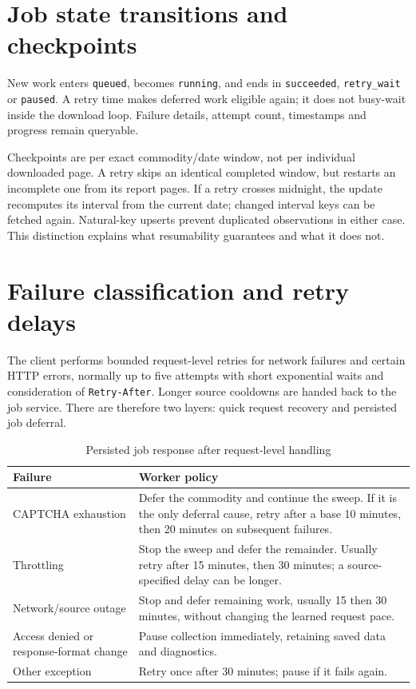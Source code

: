 \documentclass[12pt,a4paper,oneside]{report}
\numberwithin{equation}{chapter}
\numberwithin{figure}{chapter}
\numberwithin{table}{chapter}
\theoremstyle{definition}
\begin{document}
\section{Job state transitions and checkpoints}
New work enters \texttt{queued}, becomes \texttt{running}, and ends in \texttt{succeeded}, \texttt{retry\_wait} or \texttt{paused}. A retry time makes deferred work eligible again; it does not busy-wait inside the download loop. Failure details, attempt count, timestamps and progress remain queryable.

Checkpoints are per exact commodity/date window, not per individual downloaded page. A retry skips an identical completed window, but restarts an incomplete one from its report pages. If a retry crosses midnight, the update recomputes its interval from the current date; changed interval keys can be fetched again. Natural-key upserts prevent duplicated observations in either case. This distinction explains what resumability guarantees and what it does not.

\section{Failure classification and retry delays}
The client performs bounded request-level retries for network failures and certain HTTP errors, normally up to five attempts with short exponential waits and consideration of \texttt{Retry-After}. Longer source cooldowns are handed back to the job service. There are therefore two layers: quick request recovery and persisted job deferral.

\begin{table}[H]
\centering
\caption{Persisted job response after request-level handling}
\label{tab:retry}
\small
\begin{tabular}{@{}p{}p{}@{}}
\toprule
Failure & Worker policy \\
\midrule
CAPTCHA exhaustion & Defer the commodity and continue the sweep. If it is the only deferral cause, retry after a base 10 minutes, then 20 minutes on subsequent failures. \\
Throttling & Stop the sweep and defer the remainder. Usually retry after 15 minutes, then 30 minutes; a source-specified delay can be longer. \\
Network/source outage & Stop and defer remaining work, usually 15 then 30 minutes, without changing the learned request pace. \\
Access denied or response-format change & Pause collection immediately, retaining saved data and diagnostics. \\
Other exception & Retry once after 30 minutes; pause if it fails again. \\
\bottomrule
\end{tabular}
\end{table}
\end{document}
